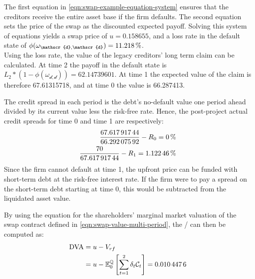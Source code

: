 \documentclass[main.tex]{subfiles}
\begin{document}
        The first equation in \cref{eqn:swap-example-equation-system} ensures that the creditors receive the entire asset base if the firm defaults.
        The second equation sets the price of the swap as the discounted expected payoff.
        Solving this system of equations yields a swap price of $u=\num{0.158655}$,
        and a loss rate in the default state of 
        $\phi(\omega_{\mathscr{d},\mathscr{d}})=\pct{0.112180}$.
        \\
        Using the loss rate, the value of the legacy creditors' long term claim can be calculated.
        At time 2 the payoff in the default state is 
        $L_{2}*(1-\phi(\omega_{\mathscr{d},\mathscr{d}})) = \num{62.14739601}$.
        At time 1 the expected value of the claim is therefore \num{67.61315718},
        and at time 0 the value is \num{66.287413}.

        The credit spread in each period is the debt's no-default value one period ahead
        divided by its current value less the risk-free rate.
        Hence, the post-project actual credit spreads for time 0 and time 1 are respectively:
        \begin{align*}
            \frac{
                \num{67.61791744}
            }{
                \num{66.29207592}
            }
            -
            R_{0}
            =
            \pct{0}
            \\
            \frac{
                \num{70}
            }{
                \num{67.61791744}
            } 
            -
            R_{1}
            =
            \pct{0.0112246}
        \end{align*}
        Since the firm cannot default at time 1,
        the upfront price can be funded with short-term debt at the risk-free interest rate.
        If the firm were to pay a spread on the short-term debt starting at time 0,
        this would be subtracted from the liquidated asset value. 

        By using the equation for the shareholders' marginal market valuation of the swap contract
        defined in \cref{eqn:swap-value-multi-period},
        the \DVA/ can then be computed as:
        \begin{align*}
            \DVA/ &= u - V_{rf}
            \nonumber
            \\
            &= u - \mathbb{E}_{0}^{\rnmeasure}\left[\sum_{t=1}^{2}\delta_t \mathcal{C}_t\right]
            = \num{0.0104476}
        \end{align*}
\end{document}
